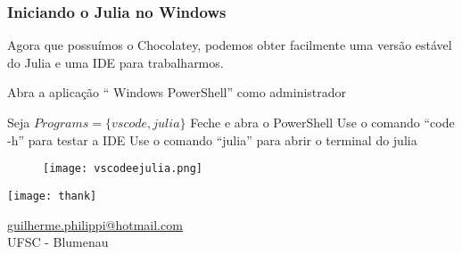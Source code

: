 \documentclass{beamer}
\begin{document}
	\begin{frame}
		\frametitle{\normalsize Iniciando o Julia no Windows} 		
		Agora que possuímos o Chocolatey, podemos obter facilmente uma versão estável do Julia e uma IDE para trabalharmos.
		\vspace{0.2cm}
		
		\begin{algorithm}[H]
			\small
			Abra a aplicação ``\color{cyan} Windows PowerShell\color{black}'' como administrador\;
			
			Seja $Programs = \{vscode, julia\}$\;
			Feche e abra o PowerShell\;
			Use o comando ``\color{cyan}code -h\color{black}'' para testar a IDE\;
			Use o comando ``\color{cyan}julia\color{black}'' para abrir o terminal do julia\;
		\end{algorithm}
	
		\begin{figure}
			\texttt{[image: vscodeejulia.png]}
		\end{figure}
		
	\end{frame}	
	
	\begin{frame}
		\centering
		\begin{minipage}{0.3\linewidth}
			\begin{flushleft}
				\texttt{[image: thank]}
			\end{flushleft}
		\end{minipage}
		\hspace{2.5cm}
		\begin{minipage}{0.4\linewidth} \centering 
			{\color{blue} \underline{guilherme.philippi@hotmail.com}} \vspace{0.2cm}  \\ UFSC - Blumenau
		\end{minipage}
	\end{frame}
\end{document}
